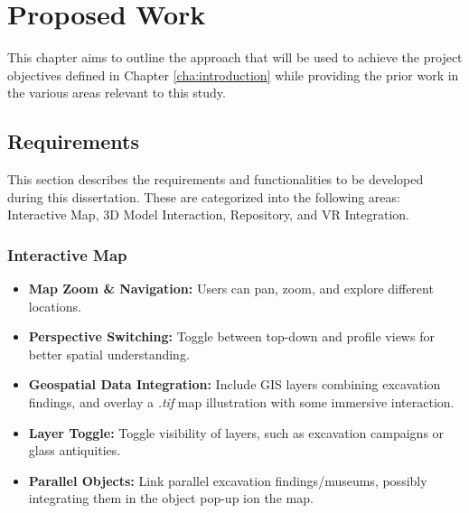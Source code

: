 
%

\chapter{Proposed Work}
\label{cha:proposed_work}

This chapter aims to outline the approach that will be used to achieve the project objectives defined in Chapter \ref{cha:introduction} while providing the prior work in the various areas relevant to this study.

\section{Requirements}
\label{sec:requirements}

This section describes the requirements and functionalities to be developed during this dissertation. These are categorized into the following areas: Interactive Map, \gls{3D} Model Interaction, Repository, and \gls{VR} Integration.

\subsection*{Interactive Map}
\begin{itemize}
    \item \textbf{Map Zoom \& Navigation:} Users can pan, zoom, and explore different locations.
    \item \textbf{Perspective Switching:} Toggle between top-down and profile views for better spatial understanding.
    \item \textbf{Geospatial Data Integration:} Include \gls{GIS} layers combining excavation findings, and overlay a \textit{.tif} map illustration with some immersive interaction.
    \item \textbf{Layer Toggle:} Toggle visibility of layers, such as excavation campaigns or glass antiquities.
    \item \textbf{Parallel Objects:} Link parallel excavation findings/museums, possibly integrating them in the object pop-up ion the map.
\end{itemize}

